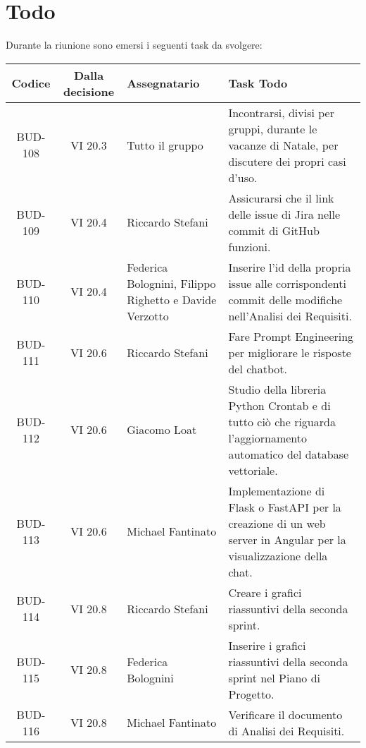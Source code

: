 
\section{Todo}

Durante la riunione sono emersi i seguenti task da svolgere:

\vspace{0.5cm}

\begin{table}[htbp]
\centering
{}
\begin{tabular}{|c|c|p{}|p{}|}
    \hline
    \rowcolor[gray]{0.75}
    \textbf{Codice} & \textbf{Dalla decisione} & \textbf{Assegnatario} & \textbf{Task Todo} \\
    \hline
    BUD-108 & VI 20.3 & Tutto il gruppo & Incontrarsi, divisi per gruppi, durante le vacanze di Natale, per discutere dei propri casi d'uso. \\
    \hline
    BUD-109 & VI 20.4 & Riccardo Stefani & Assicurarsi che il link delle issue di Jira nelle commit di GitHub funzioni. \\
    \hline
    BUD-110 & VI 20.4 & Federica Bolognini, Filippo Righetto e Davide Verzotto & Inserire l'id della propria issue alle corrispondenti commit delle modifiche
    nell'Analisi dei Requisiti. \\
    \hline
    BUD-111 & VI 20.6 & Riccardo Stefani & Fare Prompt Engineering per migliorare le risposte del chatbot. \\
    \hline
    BUD-112 & VI 20.6 & Giacomo Loat & Studio della libreria Python Crontab e di tutto ciò che riguarda l'aggiornamento automatico del database vettoriale. \\
    \hline
    BUD-113 & VI 20.6 & Michael Fantinato & Implementazione di Flask o FastAPI per la creazione di un web server in Angular per la visualizzazione della chat. \\
    \hline
    BUD-114 & VI 20.8 & Riccardo Stefani & Creare i grafici riassuntivi della seconda sprint. \\
    \hline
    BUD-115 & VI 20.8 & Federica Bolognini & Inserire i grafici riassuntivi della seconda sprint nel Piano di Progetto. \\
    \hline
    BUD-116 & VI 20.8 & Michael Fantinato & Verificare il documento di Analisi dei Requisiti. \\

\end{tabular}
\end{table}
